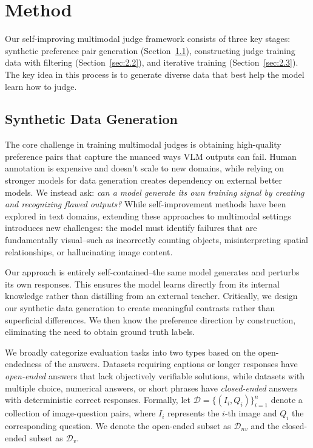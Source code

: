 \section{Method}
\label{sec:method}

Our self-improving multimodal judge framework consists of three key stages: synthetic preference pair generation (Section~\ref{sec:2.1}), constructing judge training data with filtering (Section~\ref{sec:2.2}), and iterative training (Section~\ref{sec:2.3}). The key idea in this process is to generate diverse data that best help the model learn how to judge. 

\subsection{Synthetic Data Generation}
\label{sec:2.1}
The core challenge in training multimodal judges is obtaining high-quality preference pairs that capture the nuanced ways VLM outputs can fail. Human annotation is expensive and doesn't scale to new domains, while relying on stronger models for data generation creates dependency on external better models. We instead ask: \emph{can a model generate its own training signal by creating and recognizing flawed outputs?} While self-improvement methods have been explored in text domains, extending these approaches to multimodal settings introduces new challenges: the model must identify failures that are fundamentally visual--such as incorrectly counting objects, misinterpreting spatial relationships, or hallucinating image content.

Our approach is entirely self-contained--the same model generates and perturbs its own responses. This ensures the model learns directly from its internal knowledge rather than distilling from an external teacher. Critically, we design our synthetic data generation to create meaningful contrasts rather than superficial differences. We then know the preference direction by construction, eliminating the need to obtain ground truth labels.


We broadly categorize evaluation tasks into two types based on the open-endedness of the answers. Datasets requiring captions or longer responses have \textit{open-ended} answers that lack objectively verifiable solutions, while datasets with multiple choice, numerical answers, or short phrases have \textit{closed-ended} answers with deterministic correct responses. Formally, let $\mathcal{D} = \{(I_i, Q_i)\}_{i=1}^n$ denote a collection of image-question pairs, where $I_i$ represents the $i$-th image and $Q_i$ the corresponding question. We denote the open-ended subset as $\mathcal{D}_{nv}$ and the closed-ended subset as $\mathcal{D}_v$. 

